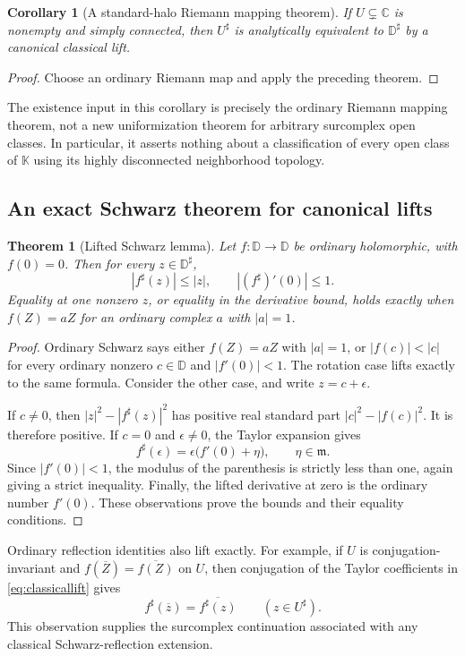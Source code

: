 \documentclass[11pt,letterpaper]{article}
\numberwithin{equation}{section}
\newtheorem{theorem}{Theorem}[section]
\newtheorem{corollary}[corollary]{Corollary}
\theoremstyle{definition}
\theoremstyle{remark}
\newcommand{\K}{\mathbb K}
\newcommand{\C}{\mathbb C}
\newcommand{\mm}{\mathfrak m}
\begin{document}
\begin{corollary}[A standard-halo Riemann mapping theorem]
If $U\subsetneq\C$ is nonempty and simply connected, then $U^\sharp$
is analytically equivalent to $\mathbb D^\sharp$ by a canonical
classical lift.
\end{corollary}
\begin{proof}
Choose an ordinary Riemann map and apply the preceding theorem.
\end{proof}

The existence input in this corollary is precisely the ordinary Riemann
mapping theorem, not a new uniformization theorem for arbitrary
surcomplex open classes. In particular, it asserts nothing about a
classification of every open class of $\K$ using its highly disconnected
neighborhood topology.

\subsection{An exact Schwarz theorem for canonical lifts}

\begin{theorem}[Lifted Schwarz lemma]\label{thm:Schwarz}
Let $f:\mathbb D\to\mathbb D$ be ordinary holomorphic, with $f(0)=0$.
Then for every $z\in\mathbb D^\sharp$,
\[
 |f^\sharp(z)|\le |z|,\qquad |(f^\sharp)'(0)|\le1.
\]
Equality at one nonzero $z$, or equality in the derivative bound, holds
exactly when $f(Z)=aZ$ for an ordinary complex $a$ with $|a|=1$.
\end{theorem}
\begin{proof}
Ordinary Schwarz says either $f(Z)=aZ$ with $|a|=1$, or
$|f(c)|<|c|$ for every ordinary nonzero $c\in\mathbb D$ and
$|f'(0)|<1$. The rotation case lifts exactly to the same formula.
Consider the other case, and write $z=c+\epsilon$.

If $c\ne0$, then $|z|^2-|f^\sharp(z)|^2$ has positive real standard
part $|c|^2-|f(c)|^2$. It is therefore positive. If $c=0$ and
$\epsilon\ne0$, the Taylor expansion gives
\[
 f^\sharp(\epsilon)=\epsilon\bigl(f'(0)+\eta\bigr),
 \qquad \eta\in\mm.
\]
Since $|f'(0)|<1$, the modulus of the parenthesis is strictly less than
one, again giving a strict inequality. Finally, the lifted derivative
at zero is the ordinary number $f'(0)$. These observations prove the
bounds and their equality conditions.
\end{proof}

Ordinary reflection identities also lift exactly. For example, if
$U$ is conjugation-invariant and
$f(\overline Z)=\overline{f(Z)}$ on $U$, then conjugation of the
Taylor coefficients in \eqref{eq:classicallift} gives
\[
 f^\sharp(\overline z)=\overline{f^\sharp(z)}
 \qquad(z\in U^\sharp).
\]
This observation supplies the surcomplex continuation associated with
any classical Schwarz-reflection extension.
\end{document}
